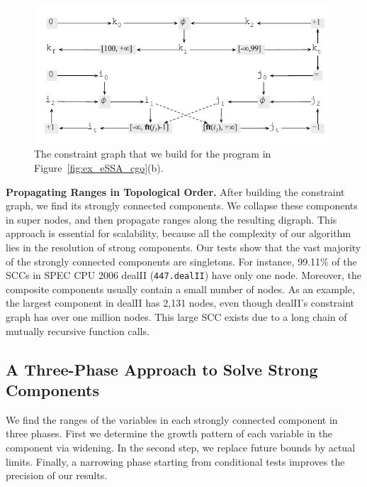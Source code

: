 \documentclass{sigplanconf}[10pt]
\begin{document}
\begin{figure}[t!]
\begin{center}
\includegraphics[width=\columnwidth]{images/ex_graph}
\end{center}
\caption{\label{fig:ex_graph}
The constraint graph that we build for the program in
Figure~\ref{fig:ex_eSSA_cgo}(b).}
\end{figure}

\noindent
\textbf{Propagating Ranges in Topological Order. }
After building the constraint graph, we find its strongly connected components.
We collapse these components in super nodes, and then propagate
ranges along the resulting digraph.
This approach is essential for scalability, because all the complexity of our
algorithm lies in the resolution of strong components.
Our tests show that the vast majority of the strongly connected components are
singletons.
For instance, 99.11\% of the SCCs in SPEC CPU 2006 dealII (\texttt{447.dealII}) have
only one node.
Moreover, the composite components usually contain a small number of nodes.
As an example, the largest component in dealII has 2,131 nodes,
even though dealII's constraint graph has over one million nodes.
This large SCC exists due to a long chain of mutually recursive function calls.

\subsection{A Three-Phase Approach to Solve Strong Components}
\label{sub:micro}

We find the ranges of the variables in each strongly connected component in
three phases.
First we determine the growth pattern of each variable in the component via
widening.
In the second step, we replace future bounds by actual limits.
Finally, a narrowing phase starting from conditional tests improves the
precision of our results.
\end{document}
